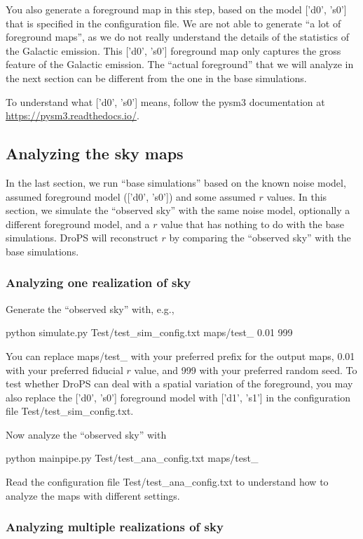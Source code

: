 \documentclass[12pt, a4paper]{ctexart} %
\def\tbox#1{\begin{tcolorbox}#1\end{tcolorbox}}
\begin{document}
You also generate a foreground map in this step, based on the model ['d0', 's0'] that is specified in the configuration file. We are not able to generate ``a lot of foreground maps'', as we do not really understand the details of the statistics of the Galactic emission. This ['d0', 's0'] foreground map only captures the gross feature of the Galactic emission. The ``actual foreground'' that we will analyze in the next section can be different from the one in the base simulations.

To understand what ['d0', 's0'] means, follow the pysm3 documentation at \url{https://pysm3.readthedocs.io/}.

\subsection{Analyzing the sky maps}

In the last section, we run ``base simulations'' based on the known noise model, assumed foreground model (['d0', 's0'])  and some assumed $r$ values. In this section, we simulate the ``observed sky'' with the same noise model, optionally a different foreground model, and a $r$ value that has nothing to do with the base simulations. DroPS will reconstruct $r$ by comparing the ``observed sky'' with  the base simulations.

\subsubsection{Analyzing one realization of sky}

Generate the ``observed sky'' with, e.g.,
\tbox{python simulate.py Test/test\_sim\_config.txt maps/test\_  0.01 999}

You can replace maps/test\_ with your preferred prefix for the output maps, 0.01 with your preferred fiducial $r$ value, and 999 with your preferred random seed. To test whether DroPS can deal with a spatial variation of the foreground, you may also replace the ['d0', 's0'] foreground model with ['d1', 's1'] in the configuration file Test/test\_sim\_config.txt.

Now analyze the ``observed sky'' with
\tbox{python mainpipe.py Test/test\_ana\_config.txt maps/test\_}
Read the configuration file Test/test\_ana\_config.txt to understand how to analyze the maps with different settings.

\subsubsection{Analyzing multiple realizations of sky}
\end{document}
